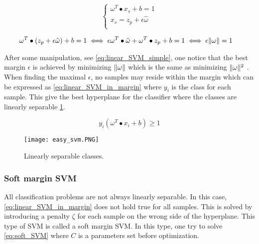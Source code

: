 \begin{equation} \label{eq:linear_SVM}
\begin{cases}
\omega^T \bullet x_s + b =1\\
x_s = z_p + \epsilon \hat{\omega} \\
\end{cases}
\end{equation}

\begin{equation} \label{eq:linear_SVM_simple}
\begin{split}
& \omega^T \bullet (z_p + \epsilon \hat{\omega}) + b = 1  \iff 
 \epsilon \omega^T \bullet \hat{\omega} + \omega^T \bullet z_p + b = 1 \iff 
\epsilon \lVert\omega\rVert = 1
\end{split}
\end{equation} 

After some manipulation, see \cref{eq:linear_SVM_simple}, one notice that the best margin $\epsilon$ is achieved by minimizing $\lVert\omega\rVert$ which is the same as minimizing $\lVert\omega\rVert^2$ . When finding the maximal $\epsilon$, no samples may reside within the margin which can be expressed as \cref{eq:linear_SVM_in_margin} where $y_i$ is the class for each sample. This give the best hyperplane for the classifier where the classes are linearly separable \cref{fig:easy_class}.

\begin{equation} \label{eq:linear_SVM_in_margin}
y_i(\omega^T \bullet x_i + b) \geq 1
\end{equation} 

\FloatBarrier
\begin{figure}[!h]
	\centering
	\texttt{[image: easy\_svm.PNG]}
	\caption{Linearly separable classes.
		\label{fig:easy_class}}
\end{figure} 
\FloatBarrier


\subsubsection{Soft margin SVM}

All classification problems are not always linearly separable. In this case, \cref{eq:linear_SVM_in_margin} does not hold true for all samples. This is solved by introducing a penalty $\zeta$ \cite{cortes1995support} for each sample on the wrong side of the hyperplane. This type of SVM is called a soft margin SVM. In this type, one try to solve \cref{eq:soft_SVM} where $C$ is a parameters set before optimization. 

